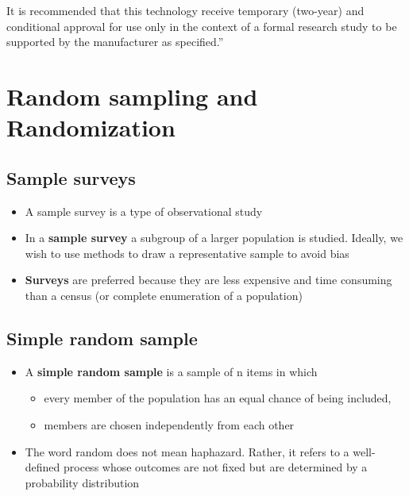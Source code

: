 \documentclass[
]{book}
\providecommand{\tightlist}{%
  \setlength{\itemsep}{0pt}\setlength{\parskip}{0pt}}
\begin{document}
It is recommended that this technology receive temporary (two-year) and conditional approval for use only in the context of a formal research study to be supported by the manufacturer as specified.''

\hypertarget{random-sampling-and-randomization}{%
\section{Random sampling and Randomization}\label{random-sampling-and-randomization}}

\hypertarget{sample-surveys}{%
\subsection{Sample surveys}\label{sample-surveys}}

\begin{itemize}
\tightlist
\item
  A sample survey is a type of observational study
\item
  In a \textbf{sample survey} a subgroup of a larger population is studied. Ideally, we wish to use methods to draw a representative sample to avoid bias
\item
  \textbf{Surveys} are preferred because they are less expensive and time consuming than a census (or complete enumeration of a population)
\end{itemize}

\hypertarget{simple-random-sample}{%
\subsection{Simple random sample}\label{simple-random-sample}}

\begin{itemize}
\tightlist
\item
  A \textbf{simple random sample} is a sample of n items in which

  \begin{itemize}
  \tightlist
  \item
    every member of the population has an equal chance of being included,
  \item
    members are chosen independently from each other
  \end{itemize}
\item
  The word random does not mean haphazard. Rather, it refers to a well-defined process whose outcomes are not fixed but are determined by a probability distribution
\end{itemize}
\end{document}
